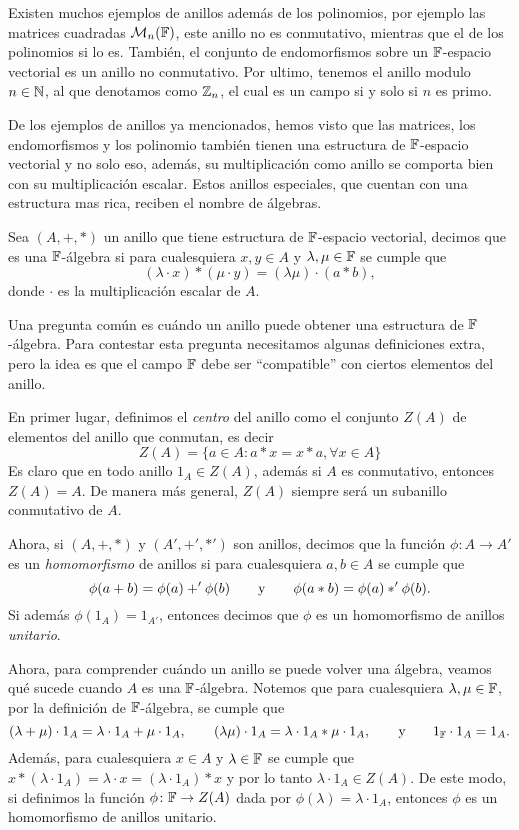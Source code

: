 Existen muchos ejemplos de anillos además de los polinomios, por ejemplo las matrices cuadradas $\mathcal{M}_n(\mathbb{F})$, este anillo no es conmutativo, mientras que el de los polinomios si lo es. También, el conjunto de endomorfismos sobre un $\mathbb{F}$-espacio vectorial es un anillo no conmutativo. Por ultimo, tenemos el anillo modulo $n \in \mathbb{N}$, al que denotamos como $\mathbb{Z}_n$, el cual es un campo si y solo si $n$ es primo.

De los ejemplos de anillos ya mencionados, hemos visto que las matrices, los endomorfismos y los polinomio también tienen una estructura de $\mathbb{F}$-espacio vectorial y no solo eso, además, su multiplicación como anillo se comporta bien con su multiplicación escalar. Estos anillos especiales, que cuentan con una estructura mas rica, reciben el nombre de álgebras.

\begin{defi}
  Sea $(A,+,*)$ un anillo que tiene estructura de $\mathbb{F}$-espacio vectorial, decimos que es una $\mathbb{F}$-álgebra si para cualesquiera $x, y \in A$ y $\lambda, \mu \in \mathbb{F}$ se cumple que
    \[ (\lambda \cdot x) *  (\mu \cdot y) = (\lambda \mu) \cdot (a * b), \]
  donde $\cdot$ es la multiplicación escalar de $A$.
\end{defi}

Una pregunta común es cuándo un anillo puede obtener una estructura de $\mathbb{F}$-álgebra. Para contestar esta pregunta necesitamos algunas definiciones extra, pero la idea es que el campo $\mathbb{F}$ debe ser ``compatible'' con ciertos elementos del anillo.

En primer lugar, definimos el \emph{centro} del anillo como el conjunto $Z(A)$ de elementos del anillo que conmutan, es decir
  \[
    Z(A) = \{a \in A : a*x = x*a, \forall x \in A \}
  \]
Es claro que en todo anillo $1_A \in Z(A)$, además si $A$ es conmutativo, entonces $Z(A) = A$. De manera más general, $Z(A)$ siempre será un subanillo conmutativo de $A$.

Ahora, si $(A, +, *)$ y $(A', +', *')$ son anillos, decimos que la función $\phi\colon A \to A'$ es un \emph{homomorfismo} de anillos si para cualesquiera $a,b \in A$ se cumple que 
\[ \phi(a+b) = \phi(a) +' \phi(b)  \qquad\text{y}\qquad  \phi(a*b) = \phi(a) *' \phi(b). \]
Si además $\phi(1_A) = 1_{A'}$, entonces decimos que $\phi$ es un homomorfismo de anillos \emph{unitario}.

Ahora, para comprender cuándo un anillo se puede volver una álgebra, veamos qué sucede cuando $A$ es una $\mathbb{F}$-álgebra. Notemos que para cualesquiera $\lambda, \mu \in \mathbb{F}$, por la definición de $\mathbb{F}$-álgebra, se cumple que
  \[
    (\lambda +\mu) \cdot 1_A = \lambda \cdot 1_A + \mu \cdot 1_A,
      \qquad 
    (\lambda \mu) \cdot 1_A = \lambda \cdot 1_A * \mu \cdot 1_A,
      \qquad\text{y}\qquad
    1_{\mathbb{F}} \cdot 1_A = 1_A.
  \]
Además, para cualesquiera $x \in A$ y $\lambda \in \mathbb{F}$ se cumple que $x * (\lambda \cdot 1_A) = \lambda \cdot x = (\lambda \cdot 1_A) * x$ y por lo tanto $\lambda \cdot 1_A \in Z(A)$. De este modo, si definimos la función $\phi\colon \mathbb{F}\to Z(A)$ dada por $\phi(\lambda) = \lambda \cdot 1_A$, entonces $\phi$ es un homomorfismo de anillos unitario.

